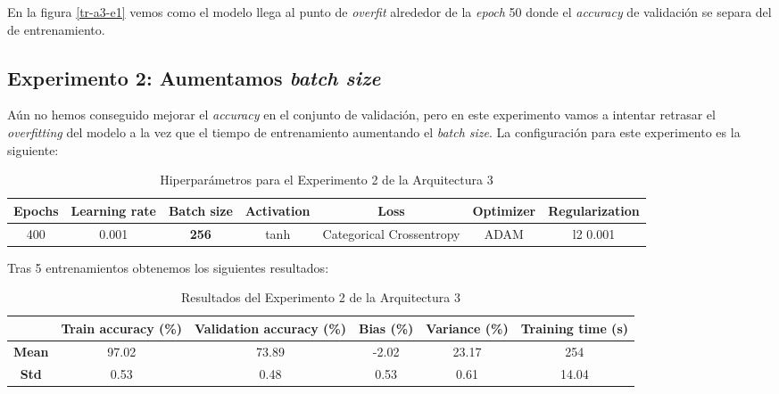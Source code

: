 \documentclass{article}
\begin{document}
			En la figura \ref{tr-a3-e1} vemos como el modelo llega al punto de \textit{overfit} alrededor de la \textit{epoch} 50 donde el \textit{accuracy} de validaci\'on se separa del de entrenamiento.
			
		\subsection{Experimento 2: Aumentamos \textit{batch size}}
		\label{s-a3-e2}
			A\'un no hemos conseguido mejorar el \textit{accuracy} en el conjunto de validaci\'on, pero en este experimento vamos a intentar retrasar el \textit{overfitting} del modelo a la vez que el tiempo de entrenamiento aumentando el \textit{batch size}. La configuraci\'on para este experimento es la siguiente:
			\begin{table}[!h]
				\begin{tabular}{| c | c | c | c | c | c | c |}
					\textbf{Epochs} & \textbf{Learning rate} & \textbf{Batch size} & \textbf{Activation} & \textbf{Loss} & \textbf{Optimizer} & \textbf{Regularization} \\ \hline
					400 & 0.001 & \textbf{256} & tanh & Categorical Crossentropy & ADAM & l2 0.001
				\end{tabular}
				\caption{Hiperpar\'ametros para el Experimento 2 de la Arquitectura 3}
				\label{tab:hip-a3-e2}
			\end{table}
				
			Tras 5 entrenamientos obtenemos los siguientes resultados:
			\begin{table}[!h]
				\begin{center}
					\begin{tabular}{ c | c | c | c | c | c |}
						\ & \textbf{Train accuracy (\%)} & \textbf{Validation accuracy (\%)} & \textbf{Bias (\%)} & \textbf{Variance (\%)} & \textbf{Training time (s)} \\ \hline
						\textbf{Mean} & 97.02 & 73.89 & -2.02 & 23.17 & 254 \\ \hline
						\textbf{Std} & 0.53 & 0.48 & 0.53 & 0.61 & 14.04 \\ \hline
					\end{tabular}
					\caption{Resultados del Experimento 2 de la Arquitectura 3}
					\label{tab:res-a3-e2}
				\end{center}
			\end{table}
				
\end{document}
